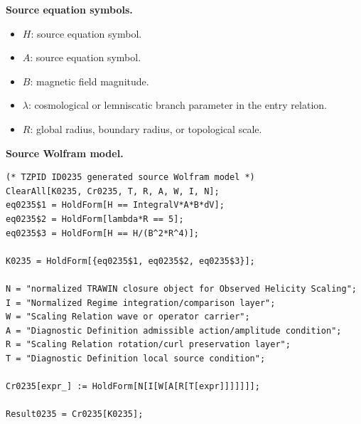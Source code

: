 \begin{minipage}[t]{0.49\linewidth}
\begingroup
\small
\raggedright
\textbf{Source equation symbols.}\par
\begin{itemize}[leftmargin=1.35em,itemsep=1pt,topsep=1pt,parsep=0pt]
    \item $H$: source equation symbol.
    \item $A$: source equation symbol.
    \item $B$: magnetic field magnitude.
    \item $\lambda$: cosmological or lemniscatic branch parameter in the entry relation.
    \item $R$: global radius, boundary radius, or topological scale.
\end{itemize}
\endgroup
\end{minipage}\hfill
\begin{minipage}[t]{0.47\linewidth}
\begingroup
\scriptsize
\raggedright
\textbf{Source Wolfram model.}\par
\begin{Verbatim}[fontsize=\tiny,breaklines=true,breakanywhere=true]
(* TZPID ID0235 generated source Wolfram model *)
ClearAll[K0235, Cr0235, T, R, A, W, I, N];
eq0235$1 = HoldForm[H == IntegralV*A*B*dV];
eq0235$2 = HoldForm[lambda*R == 5];
eq0235$3 = HoldForm[H == H/(B^2*R^4)];

K0235 = HoldForm[{eq0235$1, eq0235$2, eq0235$3}];

N = "normalized TRAWIN closure object for Observed Helicity Scaling";
I = "Normalized Regime integration/comparison layer";
W = "Scaling Relation wave or operator carrier";
A = "Diagnostic Definition admissible action/amplitude condition";
R = "Scaling Relation rotation/curl preservation layer";
T = "Diagnostic Definition local source condition";

Cr0235[expr_] := HoldForm[N[I[W[A[R[T[expr]]]]]]];

Result0235 = Cr0235[K0235];
\end{Verbatim}
\endgroup
\end{minipage}

